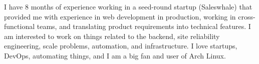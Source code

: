 

\begin{cvparagraph}

  I have 8 months of experience working in a seed-round startup (Saleswhale) that provided me with experience in web development in production, working in cross-functional teams, and translating product requirements into technical features. I am interested to work on things related to the backend, site reliability engineering, scale problems, automation, and infrastructure. I love startups, DevOps, automating things, and I am a big fan and user of Arch Linux.
\end{cvparagraph}

